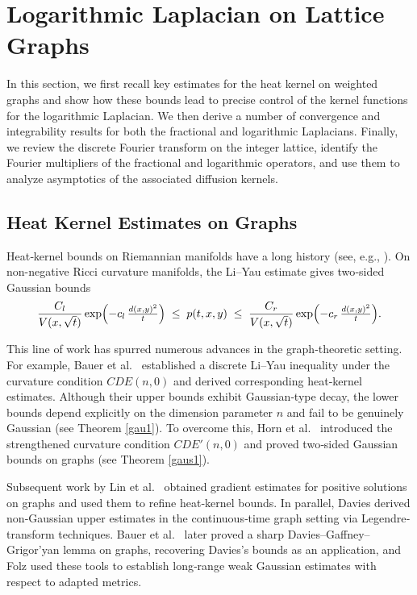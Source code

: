 \documentclass[reqno,12pt]{amsart}
\numberwithin{equation}{section}
\begin{document}
\section{Logarithmic Laplacian on Lattice Graphs}

In this section, we first recall key estimates for the heat kernel on weighted graphs and show how these bounds lead to precise control of the kernel functions for the logarithmic Laplacian.  We then derive a number of convergence and integrability results for both the fractional and logarithmic Laplacians.  Finally, we review the discrete Fourier transform on the integer lattice, identify the Fourier multipliers of the fractional and logarithmic operators, and use them to analyze asymptotics of the associated diffusion kernels.


\subsection{Heat Kernel Estimates on Graphs}\label{rehe}

Heat‐kernel bounds on Riemannian manifolds have a long history (see, e.g., \cite{davies1989heat,grigor2009heat,li1986parabolic,ondiag}).  On non-negative Ricci curvature manifolds, the Li–Yau estimate gives two‐sided Gaussian bounds
\[
\frac{C_l}{V(x,\sqrt t)}\exp\Bigl(-c_l\,\tfrac{d(x,y)^2}{t}\Bigr)
\;\le\;p(t,x,y)\;\le\;
\frac{C_r}{V(x,\sqrt t)}\exp\Bigl(-c_r\,\tfrac{d(x,y)^2}{t}\Bigr).
\]

	This line of work has spurred numerous advances in the graph‐theoretic setting.  For example, Bauer et al.\ \cite{bauer2015li} established a discrete Li–Yau inequality under the curvature condition $CDE(n,0)$ and derived corresponding heat‐kernel estimates.  Although their upper bounds exhibit Gaussian‐type decay, the lower bounds depend explicitly on the dimension parameter $n$ and fail to be genuinely Gaussian (see Theorem \ref{gau1}).  To overcome this, Horn et al.\ \cite{horn2019volume} introduced the strengthened curvature condition $CDE'(n,0)$ and proved two‐sided Gaussian bounds on graphs (see Theorem \ref{gaus1}).
	
	Subsequent work by Lin et al.\ \cite{lin2016global,lin2017gradient} obtained gradient estimates for positive solutions on graphs and used them to refine heat‐kernel bounds.  In parallel, Davies \cite{davies1993large} derived non‐Gaussian upper estimates in the continuous‐time graph setting via Legendre‐transform techniques.  Bauer et al.\ \cite{bauer2017sharp} later proved a sharp Davies–Gaffney–Grigor’yan lemma on graphs, recovering Davies’s bounds as an application, and Folz \cite{folz2011gaussian} used these tools to establish long‐range weak Gaussian estimates with respect to adapted metrics.
	
\end{document}
